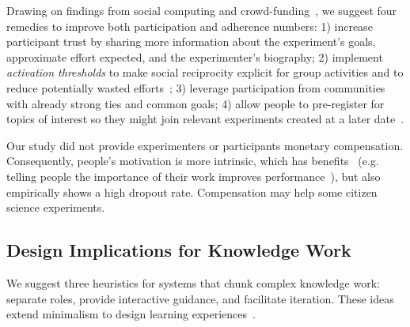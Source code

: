 Drawing on findings from social computing and crowd-funding~\cite{hui2014understanding, Karkar2017a }, we suggest four remedies to improve both participation and adherence numbers: 1) increase participant trust by sharing more information about the experiment's goals, approximate effort expected, and the experimenter's biography; 2) implement \textit{activation thresholds} to make social reciprocity explicit for group activities and to reduce potentially wasted efforts~\cite{cheng2014catalyst}; 3) leverage participation from communities with already strong ties and common goals; 4) allow people to pre-register for topics of interest so they might join relevant experiments created at a later date~\cite{bernstein2011crowds}.

Our study did not provide experimenters or participants monetary compensation. Consequently, people's motivation is more intrinsic, which has benefits~\cite{NationalCouncilforVoluntaryOrganisations2018} (e.g. telling people the importance of their work improves performance~\cite{Chandler2013}), but also empirically shows a high dropout rate. Compensation may help some citizen science experiments. 

\subsection{Design Implications for Knowledge Work}
We suggest three heuristics for systems that chunk complex knowledge work: separate roles, provide interactive guidance, and facilitate iteration. These ideas extend minimalism to design learning experiences~\cite{VanderMeij1995}. 


